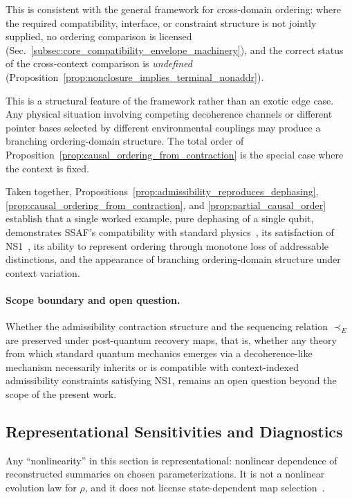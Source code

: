 \documentclass[aps,prx,onecolumn,11pt]{revtex4-2}
\theoremstyle{plain}
\theoremstyle{definition}
\theoremstyle{remark}
\begin{document}
This is consistent with the general framework for cross-domain ordering:
where the required compatibility, interface, or constraint structure is
not jointly supplied, no ordering comparison is licensed
(Sec.~\ref{subsec:core_compatibility_envelope_machinery}), and the
correct status of the cross-context comparison is \emph{undefined}
(Proposition~\ref{prop:nonclosure_implies_terminal_nonaddr}).

This is a structural feature of the framework rather than an exotic edge
case. Any physical situation involving competing decoherence channels or
different pointer bases selected by different environmental couplings may
produce a branching ordering-domain structure. The total order of
Proposition~\ref{prop:causal_ordering_from_contraction} is the special
case where the context is fixed.

Taken together,
Propositions~\ref{prop:admissibility_reproduces_dephasing},
\ref{prop:causal_ordering_from_contraction}, and
\ref{prop:partial_causal_order} establish that a single worked example,
pure dephasing of a single qubit, demonstrates SSAF's compatibility with
standard physics~\cite{Lindblad1976,Gorini1976,BreuerPetruccione2002},
its satisfaction of NS1~\cite{Gisin1989,Gisin1990}, its ability to
represent ordering through monotone loss of addressable distinctions,
and the appearance of branching ordering-domain structure under context
variation.

\paragraph{Scope boundary and open question.}

Whether the admissibility contraction structure and the sequencing
relation \(\prec_E\) are preserved under post-quantum recovery maps, that
is, whether any theory from which standard quantum mechanics emerges via
a decoherence-like mechanism necessarily inherits or is compatible with
context-indexed admissibility constraints satisfying NS1, remains an
open question beyond the scope of the present work.

\subsection{Representational Sensitivities and Diagnostics}
\label{subsec:cd_repr_and_diagnostics}

Any ``nonlinearity'' in this section is representational: nonlinear
dependence of reconstructed summaries on chosen parameterizations. It
is not a nonlinear evolution law for \(\rho\), and it does not license
state-dependent map selection~\cite{Watrous2018,NielsenChuang2010}.
\end{document}
